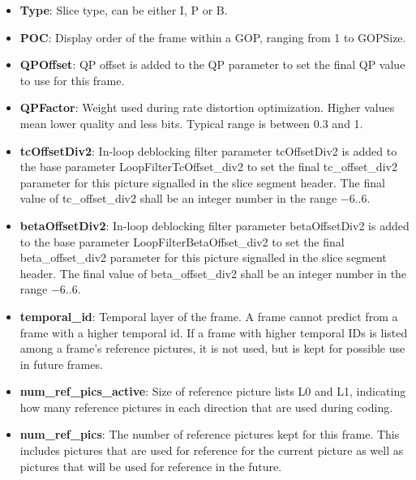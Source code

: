 \documentclass[a3paper,11pt]{jctvcdoc}
\begin{document}
\begin{itemize}
    \item[]\textbf{Type}: Slice type, can be either I, P or B.

    \item[]\textbf{POC}: Display order of the frame within a GOP, ranging
          from 1 to GOPSize.

    \item[]\textbf{QPOffset}: QP offset is added to the QP parameter to set
          the final QP value to use for this frame.

    \item[]\textbf{QPFactor}: Weight used during rate distortion
          optimization. Higher values mean lower quality and less bits. Typical
          range is between
          0.3 and 1.

    \item[]\textbf{tcOffsetDiv2}: In-loop deblocking filter parameter tcOffsetDiv2
          is added to the base parameter LoopFilterTcOffset_div2 to set the final tc_offset_div2
          parameter for this picture signalled in the slice segment header. The final
          value of tc_offset_div2 shall be an integer number in the range $-6..6$.

    \item[]\textbf{betaOffsetDiv2}: In-loop deblocking filter parameter betaOffsetDiv2
          is added to the base parameter LoopFilterBetaOffset_div2 to set the final beta_offset_div2
          parameter for this picture signalled in the slice segment header. The final
          value of beta_offset_div2 shall be an integer number in the range $-6..6$.

    \item[]\textbf{temporal_id}: Temporal layer of the frame. A frame cannot
          predict from a frame with a higher temporal id. If a frame with higher
          temporal IDs is listed among a frame's reference pictures, it is
          not used, but is kept for possible use in future frames.

    \item[]\textbf{num_ref_pics_active}: Size of reference picture lists L0
          and L1, indicating how many reference pictures in each direction that
          are used during coding.

    \item[]\textbf{num_ref_pics}: The number of reference pictures kept for
          this frame.  This includes pictures that are used for reference for the
          current picture as well as pictures that will be used for reference in
          the future.


\end{itemize}
\end{document}
